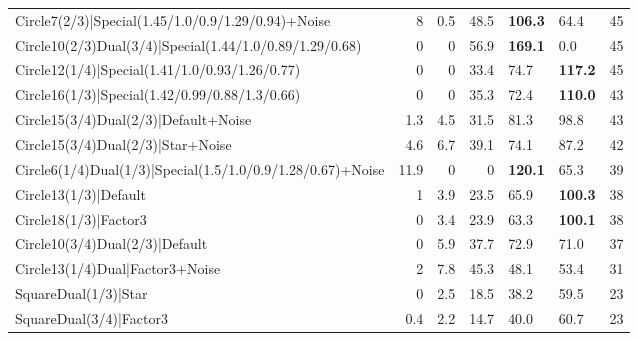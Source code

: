 \begin{tabular}{lrrrllr}
 Circle7(2/3)|Special(1.45/1.0/0.9/1.29/0.94)+Noise             &          8   &            0.5 &          48.5 & \textbf{106.3} & 64.4           &           45 \\
 Circle10(2/3)Dual(3/4)|Special(1.44/1.0/0.89/1.29/0.68)        &          0   &            0   &          56.9 & \textbf{169.1} & 0.0            &           45 \\
 Circle12(1/4)|Special(1.41/1.0/0.93/1.26/0.77)                 &          0   &            0   &          33.4 & 74.7           & \textbf{117.2} &           45 \\
 Circle16(1/3)|Special(1.42/0.99/0.88/1.3/0.66)                 &          0   &            0   &          35.3 & 72.4           & \textbf{110.0} &           43 \\
 Circle15(3/4)Dual(2/3)|Default+Noise                           &          1.3 &            4.5 &          31.5 & 81.3           & 98.8           &           43 \\
 Circle15(3/4)Dual(2/3)|Star+Noise                              &          4.6 &            6.7 &          39.1 & 74.1           & 87.2           &           42 \\
 Circle6(1/4)Dual(1/3)|Special(1.5/1.0/0.9/1.28/0.67)+Noise     &         11.9 &            0   &           0   & \textbf{120.1} & 65.3           &           39 \\
 Circle13(1/3)|Default                                          &          1   &            3.9 &          23.5 & 65.9           & \textbf{100.3} &           38 \\
 Circle18(1/3)|Factor3                                          &          0   &            3.4 &          23.9 & 63.3           & \textbf{100.1} &           38 \\
 Circle10(3/4)Dual(2/3)|Default                                 &          0   &            5.9 &          37.7 & 72.9           & 71.0           &           37 \\
 Circle13(1/4)Dual|Factor3+Noise                                &          2   &            7.8 &          45.3 & 48.1           & 53.4           &           31 \\
 SquareDual(1/3)|Star                                           &          0   &            2.5 &          18.5 & 38.2           & 59.5           &           23 \\
 SquareDual(3/4)|Factor3                                        &          0.4 &            2.2 &          14.7 & 40.0           & 60.7           &           23 \\

\end{tabular}
